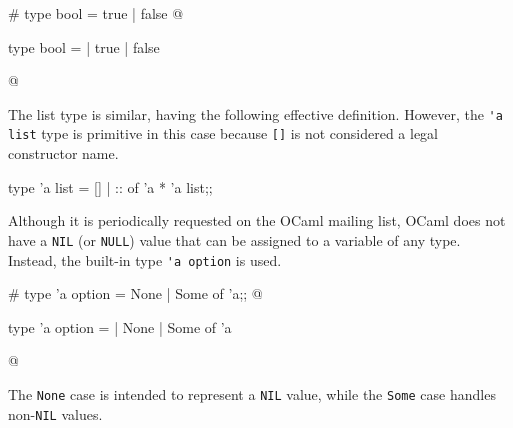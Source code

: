 \begin{ocaml}
# type bool =
     true
   | false
@
\begin{topoutput}
type bool = | true | false
\end{topoutput}
@
\end{ocaml}
%
The list type is similar, having the following effective definition.
However, the \hbox{\lstinline/'a list/} type is primitive in this case because
\hbox{\lstinline/[]/} is not considered a legal constructor name.

\begin{ocaml}
type 'a list =
   []
 | :: of 'a * 'a list;;
\end{ocaml}
%
Although it is periodically requested on the OCaml mailing list, OCaml
does not have a \lstinline/NIL/ (or \lstinline/NULL/) value that can be assigned to a variable of
any type.  Instead, the built-in type \hbox{\lstinline/'a option/} is used.

\begin{ocaml}
# type 'a option =
     None
   | Some of 'a;;
@
\begin{topoutput}
type 'a option = | None | Some of 'a
\end{topoutput}
@
\end{ocaml}
%
The \hbox{\lstinline/None/} case is intended to represent a \lstinline/NIL/ value, while the
\hbox{\lstinline/Some/} case handles non-\lstinline/NIL/ values.
